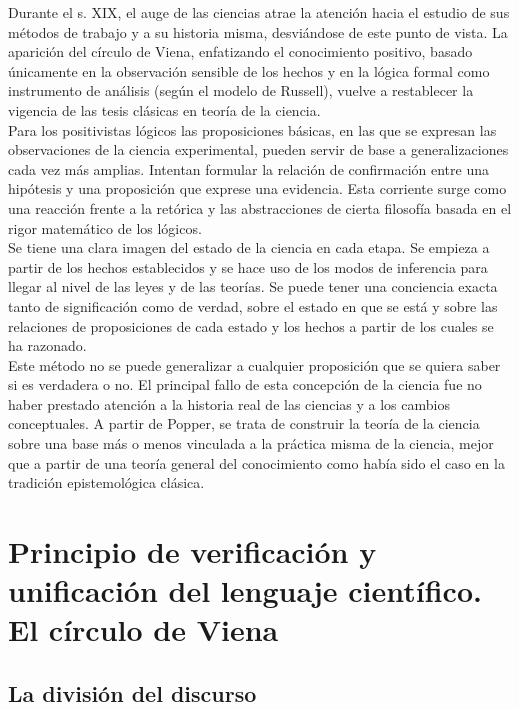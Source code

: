 \documentclass[a4paper, 11pt, twocolumn, spanish]{article}
\begin{document}
Durante el s. XIX, el auge de las ciencias atrae la atención hacia el
estudio de sus métodos de trabajo y a su historia misma, desviándose
de este punto de vista. La aparición del círculo de Viena, enfatizando
el conocimiento positivo, basado únicamente en la observación sensible
de los hechos y en la lógica formal como instrumento de análisis
(según el modelo de Russell), vuelve a restablecer la vigencia de las
tesis clásicas en teoría de la ciencia.\\

Para los positivistas lógicos las proposiciones básicas, en las que se
expresan las observaciones de la ciencia experimental, pueden servir
de base a generalizaciones cada vez más amplias.  Intentan formular la
relación de confirmación entre una hipótesis y una proposición que
exprese una evidencia. Esta corriente surge como una reacción frente a
la retórica y las abstracciones de cierta filosofía basada en el rigor
matemático de los lógicos.\\
Se tiene una clara imagen del estado de la ciencia en cada etapa. Se
empieza a partir de los hechos establecidos y se hace uso de los modos
de inferencia para llegar al nivel de las leyes y de las teorías. Se
puede tener una conciencia exacta tanto de significación como de
verdad, sobre el estado en que se está y sobre las relaciones de
proposiciones de cada estado y los hechos a partir de los cuales se ha
razonado.\\

Este método no se puede generalizar a cualquier proposición que se
quiera saber si es verdadera o no. El principal fallo de esta
concepción de la ciencia fue no haber prestado atención a la historia
real de las ciencias y a los cambios conceptuales. A partir de Popper,
se trata de construir la teoría de la ciencia sobre una base más o
menos vinculada a la práctica misma de la ciencia, mejor que a partir
de una teoría general del conocimiento como había sido el caso en la
tradición epistemológica clásica.

\section{Principio de verificación y unificación del lenguaje científico. El círculo de Viena}
\label{sec:orgeb30ab1}
\subsection{La división del discurso}
\label{sec:org4f1479f}
\end{document}
